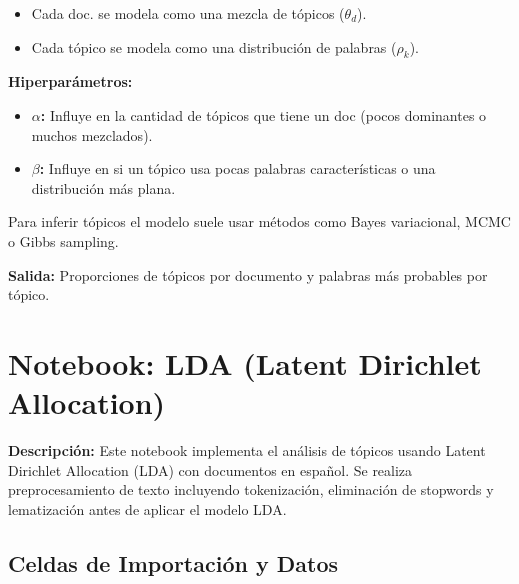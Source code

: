 \documentclass[12pt]{article}
\begin{document}
\begin{itemize}
    \item Cada doc. se modela como una mezcla de tópicos ($\theta_d$).
    \item Cada tópico se modela como una distribución de palabras ($\rho_k$).
\end{itemize}

\textbf{Hiperparámetros:}
\begin{itemize}
    \item \textbf{$\alpha$:} Influye en la cantidad de tópicos que tiene un doc (pocos dominantes o muchos mezclados).
    \item \textbf{$\beta$:} Influye en si un tópico usa pocas palabras características o una distribución más plana.
\end{itemize}

Para inferir tópicos el modelo suele usar métodos como Bayes variacional, MCMC o Gibbs sampling.

\textbf{Salida:} Proporciones de tópicos por documento y palabras más probables por tópico.

\vspace{1em}

\section*{Notebook: LDA (Latent Dirichlet Allocation)}

\textbf{Descripción:} Este notebook implementa el análisis de tópicos usando Latent Dirichlet Allocation (LDA) con documentos en español. Se realiza preprocesamiento de texto incluyendo tokenización, eliminación de stopwords y lematización antes de aplicar el modelo LDA.

\subsection*{Celdas de Importación y Datos}
\end{document}
